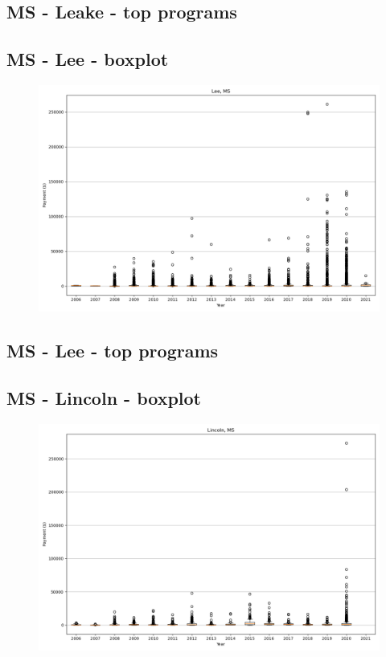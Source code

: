 \subsection*{MS - Leake - top programs}

\newpage
\subsection*{MS - Lee - boxplot}
\begin{figure}[h]
\centering
\includegraphics[width=7in]{../output/boxplots/counties/Lee-MS_boxplot.png}
\end{figure}


\subsection*{MS - Lee - top programs}

\newpage
\subsection*{MS - Lincoln - boxplot}
\begin{figure}[h]
\centering
\includegraphics[width=7in]{../output/boxplots/counties/Lincoln-MS_boxplot.png}
\end{figure}


